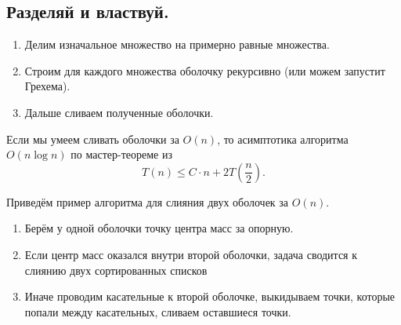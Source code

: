 \subsection{Разделяй и властвуй.}
\begin{enumerate}
  \item Делим изначальное множество на примерно равные множества. 
  \item Строим для каждого множества оболочку рекурсивно (или можем запустит Грехема). 
  \item Дальше сливаем полученные оболочки.
\end{enumerate}
\begin{remark}
  Если мы умеем сливать оболочки за $O(n)$, то асимптотика алгоритма $O(n \log n)$ по мастер-теореме из
   \[
     T(n) \leq C \cdot n + 2T \left( \frac{n}{2} \right) 
  .\] 
\end{remark}

Приведём пример алгоритма для слияния двух оболочек за $O(n)$.
\begin{enumerate}
  \item Берём у одной оболочки точку центра масс за опорную.
  \item Если центр масс оказался внутри второй оболочки, задача сводится к слиянию двух сортированных
    списков
  \item Иначе проводим касательные к второй оболочке, выкидываем точки, которые попали между касательных,
    сливаем оставшиеся точки.
\end{enumerate}

